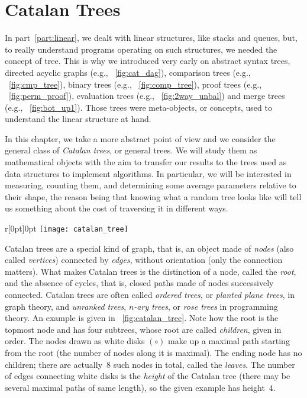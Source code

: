 \chapter{Catalan Trees}
\label{chap:Catalan}

In part~\ref{part:linear}, we dealt with linear structures, like
stacks and queues, but, to really understand programs operating on
such structures, we needed the concept of tree. This is why we
introduced very early on abstract syntax trees, directed acyclic graphs (e.g.,
\fig~\vref{fig:cat_dag}), comparison trees (e.g.,
\fig~\vref{fig:cmp_tree}), binary trees (e.g.,
\fig~\vref{fig:comp_tree}), proof trees (e.g.,
\fig~\vref{fig:perm_proof}), evaluation trees (e.g.,
\fig~\vref{fig:2way_unbal}) and merge trees (e.g.,
\fig~\vref{fig:bot_up1}). Those trees were meta\hyp{}objects, or
concepts, used to understand the linear structure at hand.

In this chapter, we take a more abstract point of view and we consider
the general class of \emph{Catalan trees}, or general trees. We will
study them as mathematical objects with the aim to transfer our
results to the trees used as data structures to implement
algorithms. In particular, we will be interested in measuring,
counting them, and determining some average parameters relative to
their shape, the reason being that knowing what a random tree looks
like will tell us something about the cost of traversing it in
different ways.

%
\begin{wrapfigure}[9]{r}[0pt]{0pt}
\centering
\texttt{[image: catalan\_tree]} %
\caption{Catalan tree of height~4}
\label{fig:catalan_tree}
\end{wrapfigure}
Catalan trees are a special kind of graph, that is, an object made of
\emph{nodes} (also called \emph{vertices}) connected by \emph{edges},
without orientation (only the connection matters). What makes Catalan
trees is the distinction of a node, called the \emph{root}, and the
absence of cycles, that is, closed paths made of nodes successively
connected. Catalan trees are often called \emph{ordered trees}, or
\emph{planted plane trees}, in graph theory, and \emph{unranked
trees}, \emph{\(n\)-ary trees}, or \emph{rose trees} in programming
theory. An example is given in \fig~\ref{fig:catalan_tree}. Note how
the root is the topmost node and has four subtrees, whose root are
called \emph{children}, given in order. The nodes drawn as white disks
\((\circ)\) make up a maximal path starting from the root (the number
of nodes along it is maximal). The ending node has no children; there
are actually~\(8\) such nodes in total, called the \emph{leaves}. The
number of edges connecting white disks is the \emph{height} of the
Catalan tree (there may be several maximal paths of same length), so
the given example has height~\(4\).

